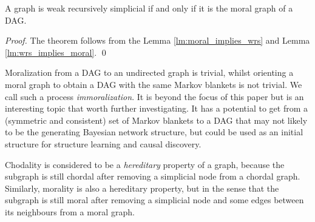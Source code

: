 \begin{theorem}
\label{thm:wrs_equal_moral}
A graph is weak recursively simplicial if and only if it is the moral graph of a DAG. 
\end{theorem}
\begin{proof}
The theorem follows from the Lemma \ref{lm:moral_implies_wrs} and Lemma \ref{lm:wrs_implies_moral}. \qed
\end{proof}
Moralization from a DAG to an undirected graph is trivial, whilst orienting a moral graph to obtain a DAG with the same Markov blankets is not trivial. We call such a process \textit{immoralization}. It is beyond the focus of this paper but is an interesting topic that worth further investigating. It has a potential to get from a (symmetric and consistent) set of Markov blankets to a DAG that may not likely to be the generating Bayesian network structure, but could be used as an initial structure for structure learning and causal discovery. 

Chodality is considered to be a \textit{hereditary} property of a graph, because the subgraph is still chordal after removing a simplicial node from a chordal graph. Similarly, morality is also a hereditary property, but in the sense that the subgraph is still moral after removing a simplicial node and some edges between its neighbours from a moral graph. 

\iffalse
\begin{corollary}
Let $\mathcal{F}=\{F=(V,E) \mid F \text{ is weak recursively simplicial}\}$ be the set of weak recursively simplicial graphs over $V$ and $\mathcal{B} = \{B_V^G \mid \text{for all DAG $G$ over $V$}\}$ be the set of Markov blanket families of any DAG over $V$. Then $|\mathcal{F}| = |\mathcal{B}|$. 
\end{corollary}
\begin{proof}
It is straightforward that there is a one-to-one correspondance between $\mathcal{B}$ and moral graphs. Hence, Corollary \ref{cor:wrs_equal_moral} implies that $\mathcal{F}$ has a one-to-one correspondance with $\mathcal{B}$, so equal cardinality. \qed
\end{proof}
\fi

